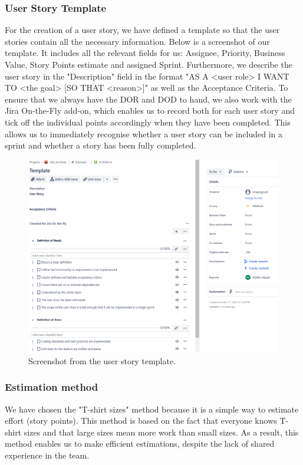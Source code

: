 \subsubsection{User Story Template}
For the creation of a user story, we have defined a template so that the user stories contain all the necessary information. Below is a screenshot of our template. It includes all the relevant fields for us: Assignee, Priority, Business Value, Story Points estimate and assigned Sprint. Furthermore, we describe the user story in the "Description" field in the format "AS A <user role> I WANT TO <the goal> [SO THAT <reason>]" as well as the Acceptance Criteria.
To ensure that we always have the DOR and DOD to hand, we also work with the Jira On-the-Fly add-on, which enables us to record both for each user story and tick off the individual points accordingly when they have been completed. This allows us to immediately recognise whether a user story can be included in a sprint and whether a story has been fully completed.
\begin{figure}[h!]
    \centering
    \includegraphics[width=1\textwidth]{pictures/Scrum/userstory_template}
    \caption{Screenshot from the user story template.}
    \label{fig:user_story_template}
\end{figure}
\clearpage

\subsubsection{Estimation method}
We have chosen the "T-shirt sizes" method because it is a simple way to estimate effort (story points). This method is based on the fact that everyone knows T-shirt sizes and that large sizes mean more work than small sizes. As a result, this method enables us to make efficient estimations, despite the lack of shared experience in the team.

